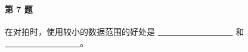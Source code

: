 \paragraph{第 7 题} 在对拍时，使用较小的数据范围的好处是
\underline{\quad~~~~~~~~~~~~~~~~~~} 和
\underline{\quad~~~~~~~~~~~~~~~~~~}。
